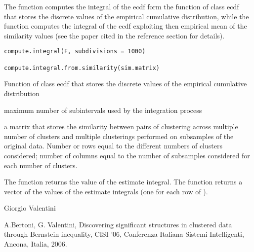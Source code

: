 \documentclass{article}
\begin{document}
\begin{Description}\relax
The function  computes the integral of the ecdf form the function of 
class ecdf  that stores the discrete values of the empirical cumulative distribution, while
the function  computes the integral of the ecdf
exploiting then empirical mean of the similarity values (see the paper cited in the reference section for details).
\end{Description}
\begin{Usage}
\begin{verbatim}
compute.integral(F, subdivisions = 1000)

compute.integral.from.similarity(sim.matrix)
\end{verbatim}
\end{Usage}
\begin{Arguments}
\begin{ldescription}
\item[\code{F}] Function of class ecdf  that stores the discrete values of the empirical cumulative distribution 
\item[\code{subdivisions}] maximum number of subintervals used by the integration process 
\item[\code{sim.matrix}] a matrix that stores the similarity between pairs of clustering across multiple number of clusters
and multiple clusterings performed on subsamples of the original data.
Number or rows equal to the different numbers of clusters considered; number of columns      
equal to  the number of subsamples considered for each number of clusters. 
\end{ldescription}
\end{Arguments}
\begin{Value}
The function  returns the value of the estimate integral.
The function  returns a vector of the values of the estimate integrals (one for each row of ).
\end{Value}
\begin{Author}\relax
Giorgio Valentini 
\end{Author}
\begin{References}\relax
A.Bertoni, G. Valentini, Discovering significant structures in clustered data through Bernstein inequality, 
CISI '06, Conferenza Italiana Sistemi Intelligenti, Ancona, Italia, 2006.
\end{References}
\end{document}
